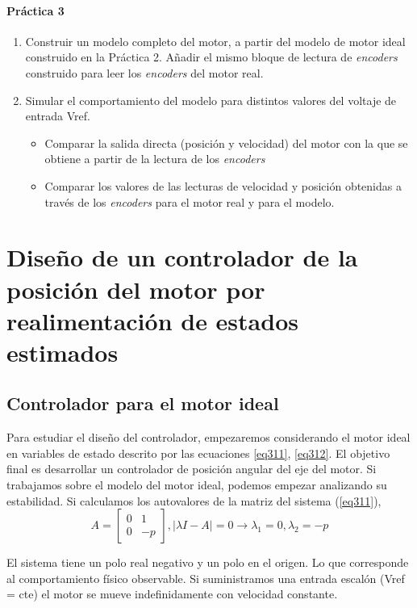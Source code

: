 \documentclass[10pt,a4paper]{report}
\begin{document}
\paragraph{Práctica 3}
\begin{enumerate}
\item Construir un modelo completo del motor, a partir del modelo de motor ideal construido en la Práctica 2. Añadir el mismo bloque de lectura de \emph{encoders} construido para leer los \emph{encoders} del motor real.

\item Simular el comportamiento del modelo para distintos valores del voltaje de entrada Vref. 
\begin{itemize}
\item Comparar la salida directa (posición y velocidad) del motor con la que se obtiene a partir de la lectura de los \emph{encoders}
\item Comparar los valores de las lecturas de velocidad y posición obtenidas a través de los \emph{encoders} para el motor real y para el modelo.
\end{itemize}
\end{enumerate}

\section{Diseño de un controlador de la posición del motor por realimentación de estados estimados}
\subsection{Controlador para el motor ideal}
Para estudiar el diseño del controlador, empezaremos considerando el motor ideal en variables de estado descrito por las ecuaciones \ref{eq311}, \ref{eq312}. El objetivo final es desarrollar un controlador de posición angular del eje del motor. Si trabajamos sobre el modelo del motor ideal, podemos empezar analizando su estabilidad. Si calculamos los autovalores de la matriz del sistema (\ref{eq311}),
\begin{equation}
A = \begin{bmatrix}
0 & 1\\
0 &-p
\end{bmatrix}, \vert \lambda I-A\vert = 0 \rightarrow \lambda_1 = 0, \lambda_2=-p
\end{equation}

El sistema tiene un polo real negativo y un polo en el origen. Lo que corresponde al comportamiento físico observable. Si suministramos una entrada escalón (Vref = cte) el motor se mueve indefinidamente con velocidad constante. 
\end{document}
